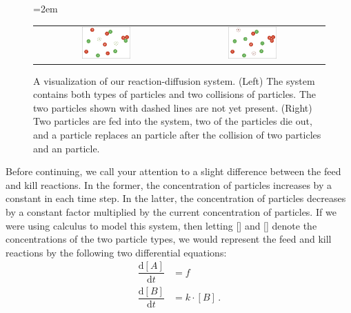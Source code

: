 \begin{figure}[h]
\centering
\mySfFamily
\tabcolsep=2em
\begin{tabular}{c c}
\includegraphics[width=0.35\textwidth]{../images/reaction-diffusion_three_reactions_before} & \includegraphics[width=0.35\textwidth]{../images/reaction-diffusion_three_reactions_after}\\
\end{tabular}
\caption{A visualization of our reaction-diffusion system. (Left) The system contains both types of particles and two collisions of particles. The two  particles shown with dashed lines are not yet present.  (Right) Two  particles are fed into the system, two of the  particles die out, and a  particle replaces an  particle after the collision of two  particles and an  particle.}
\label{fig:three_reactions}
\end{figure}

Before continuing, we call your attention to a slight difference between the feed and kill reactions. In the former, the concentration of  particles increases by a constant in each time step. In the latter, the concentration of  particles decreases by a constant factor multiplied by the current concentration of  particles. If we were using calculus to model this system, then letting [] and [] denote the concentrations of the two particle types, we would represent the feed and kill reactions by the following two differential equations:
\begin{align*}
\dfrac{\mathrm{d}[A]}{\mathrm{d}t} & = f\\[1ex]
\dfrac{\mathrm{d}[B]}{\mathrm{d}t} & = k \cdot [B]\,.
\end{align*}

\FloatBarrier
{}
